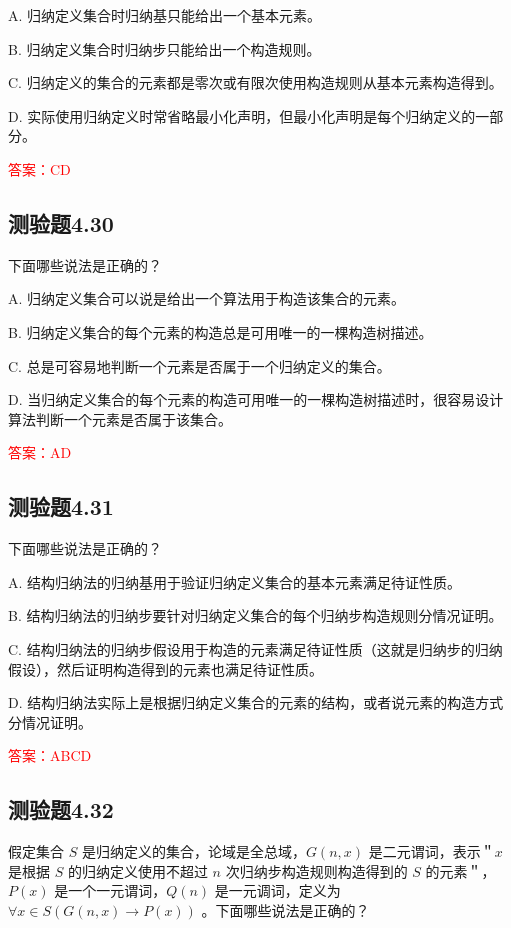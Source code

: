 \documentclass[UTF8, heading=true]{ctexart}
\begin{document}
A. 归纳定义集合时归纳基只能给出一个基本元素。

B. 归纳定义集合时归纳步只能给出一个构造规则。

C. 归纳定义的集合的元素都是零次或有限次使用构造规则从基本元素构造得到。

D. 实际使用归纳定义时常省略最小化声明，但最小化声明是每个归纳定义的一部分。

\textcolor{red}{答案：CD}

\subsection{测验题4.30}

下面哪些说法是正确的？

A. 归纳定义集合可以说是给出一个算法用于构造该集合的元素。

B. 归纳定义集合的每个元素的构造总是可用唯一的一棵构造树描述。

C. 总是可容易地判断一个元素是否属于一个归纳定义的集合。

D. 当归纳定义集合的每个元素的构造可用唯一的一棵构造树描述时，很容易设计算法判断一个元素是否属于该集合。

\textcolor{red}{答案：AD}

\subsection{测验题4.31}

下面哪些说法是正确的？

A. 
结构归纳法的归纳基用于验证归纳定义集合的基本元素满足待证性质。

B. 
结构归纳法的归纳步要针对归纳定义集合的每个归纳步构造规则分情况证明。

C. 
结构归纳法的归纳步假设用于构造的元素满足待证性质（这就是归纳步的归纳假设），然后证明构造得到的元素也满足待证性质。

D. 
结构归纳法实际上是根据归纳定义集合的元素的结构，或者说元素的构造方式分情况证明。

\textcolor{red}{答案：ABCD}

\subsection{测验题4.32}

假定集合 $S$ 是归纳定义的集合，论域是全总域，$G(n, x)$ 是二元谓词，表示＂$x$ 是根据 $S$ 的归纳定义使用不超过 $n$ 次归纳步构造规则构造得到的 $S$ 的元素＂，$P(x)$ 是一个一元谓词，$Q(n)$ 是一元调词，定义为 $\forall x \in S(G(n, x) \rightarrow P(x))$ 。下面哪些说法是正确的？
\end{document}
